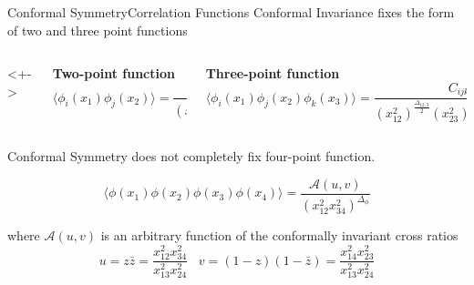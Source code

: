 \documentclass[pdf]{beamer}
\begin{document}
                \begin{frame}[t]{Conformal Symmetry}{Correlation Functions}
                    \onslide<+->
                        Conformal Invariance fixes the form of two and three point functions
                    \vspace{10pt}

                    \begin{columns}<+->

                        \begin{column}[]{0.3\textwidth}
                            \centering
                            \textbf{Two-point function}
                            \small
                            \begin{equation*}
                                \langle\phi_i(x_1)\phi_j(x_2)\rangle = \frac{\delta_{ij}}{(x_{12}^2)^{\Delta_{\phi}}}
                            \end{equation*}
                        \end{column}

                        \vline
                        
                        \begin{column}{0.7\textwidth}
                            \centering
                            \textbf{Three-point function}
                            \small
                            \begin{equation*}
                                \langle\phi_i(x_1)\phi_j(x_2)\phi_k(x_3)\rangle = \frac{C_{ijk}}{(x_{12}^2)^{\frac{\Delta_{12,3}}{2}}(x_{23}^2)^{\frac{\Delta_{23,1}}{2}}(x_{13}^2)^{\frac{\Delta_{13,2}}{2}}}
                            \end{equation*}
                        \end{column}

                    \end{columns}

                    \onslide<+->
                    \vspace{5pt}
                        Conformal Symmetry does not completely fix four-point function.

                    \begin{equation*}
                        \langle\phi(x_1)\phi(x_2)\phi(x_3)\phi(x_4)\rangle = \frac{\mathcal{A}(u,v)}{(x_{12}^2x_{34}^2)^{\Delta_{\phi}}}
                    \end{equation*}

                    \onslide<+-> 
                        where $\mathcal{A}(u,v)$ is an arbitrary function of the conformally invariant cross ratios 
                    \small
                    \begin{equation*}
                        u =z\bar{z} =  \frac{x_{12}^2x_{34}^2}{x_{13}^2x_{24}^2}\hspace{10pt} v = (1-z)(1-\bar{z}) = \frac{x_{14}^2x_{23}^2}{x_{13}^2x_{24}^2}
                    \end{equation*}

                \end{frame}
\end{document}
